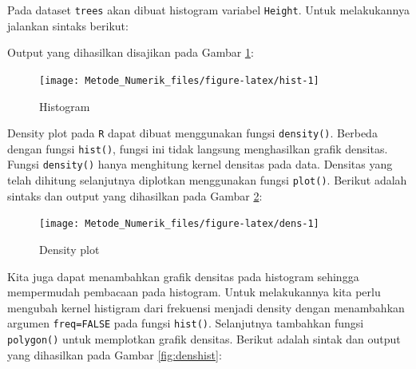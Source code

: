 \documentclass[]{book}
\newenvironment{Shaded}{\begin{snugshade}}{\end{snugshade}}
\newcommand{\CommentTok}[1]{\textcolor[rgb]{0.56,0.35,0.01}{\textit{#1}}}
\newcommand{\DataTypeTok}[1]{\textcolor[rgb]{0.13,0.29,0.53}{#1}}
\newcommand{\KeywordTok}[1]{\textcolor[rgb]{0.13,0.29,0.53}{\textbf{#1}}}
\newcommand{\NormalTok}[1]{#1}
\newcommand{\OperatorTok}[1]{\textcolor[rgb]{0.81,0.36,0.00}{\textbf{#1}}}
\newcommand{\StringTok}[1]{\textcolor[rgb]{0.31,0.60,0.02}{#1}}
\theoremstyle{definition}
\theoremstyle{definition}
\theoremstyle{definition}
\theoremstyle{remark}
\begin{document}
Pada dataset \texttt{trees} akan dibuat histogram variabel \texttt{Height}. Untuk melakukannya jalankan sintaks berikut:

\begin{Shaded}
\end{Shaded}

Output yang dihasilkan disajikan pada Gambar \ref{fig:hist}:

\begin{figure}

{\centering \texttt{[image: Metode\_Numerik\_files/figure-latex/hist-1]} 

}

\caption{Histogram}\label{fig:hist}
\end{figure}

Density plot pada \texttt{R} dapat dibuat menggunakan fungsi \texttt{density()}. Berbeda dengan fungsi \texttt{hist()}, fungsi ini tidak langsung menghasilkan grafik densitas. Fungsi \texttt{density()} hanya menghitung kernel densitas pada data. Densitas yang telah dihitung selanjutnya diplotkan menggunakan fungsi \texttt{plot()}. Berikut adalah sintaks dan output yang dihasilkan pada Gambar \ref{fig:dens}:

\begin{Shaded}
\end{Shaded}

\begin{figure}

{\centering \texttt{[image: Metode\_Numerik\_files/figure-latex/dens-1]} 

}

\caption{Density plot}\label{fig:dens}
\end{figure}

Kita juga dapat menambahkan grafik densitas pada histogram sehingga mempermudah pembacaan pada histogram. Untuk melakukannya kita perlu mengubah kernel histigram dari frekuensi menjadi density dengan menambahkan argumen \texttt{freq=FALSE} pada fungsi \texttt{hist()}. Selanjutnya tambahkan fungsi \texttt{polygon()} untuk memplotkan grafik densitas. Berikut adalah sintak dan output yang dihasilkan pada Gambar \ref{fig:denshist}:
\end{document}
